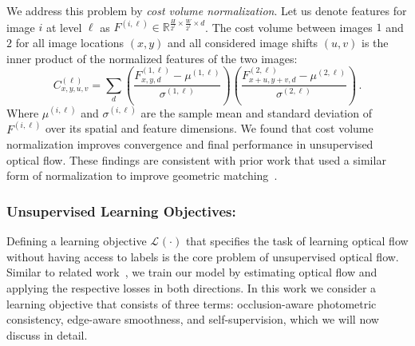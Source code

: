 \documentclass[runningheads]{llncs}
\newcommand{\lossfun}[1]{\mathcal{L}_\mathit{#1}}
\newcommand{\level}{\ell}
\begin{document}
We address this problem by \emph{cost volume normalization}. Let us denote features for image $i$ at level $\level$ as $F^{(i,\level)} \in \mathbb{R}^{\frac{H}{2^\level}\times \frac{W}{2^\level}\times d}$. The cost volume between images $1$ and $2$ for all image locations $(x, y)$ and all considered image shifts $(u, v)$ is the inner product of the normalized features of the two images:
\begin{equation}
C^{(\level)}_{x, y, u,v} = \sum_d \left(\frac{ F^{(1, \level)}_{x, y, d} - \mu^{(1, \level)}}{\sigma^{(1, \level)}} \right) \left( \frac{F^{(2,\level)}_{x+u, y+v, d}  - \mu^{(2, \level)}}{\sigma^{(2, \level)}} \right) \, .
\end{equation}
Where $\mu^{(i, \level)}$ and $\sigma^{(i, \level)}$ are the sample mean and standard deviation of $F^{(i,\level)}$ over its spatial and feature dimensions. We found that cost volume normalization improves convergence and final performance in unsupervised optical flow. These findings are consistent with prior work that used a similar form of normalization to improve geometric matching~\cite{rocco2017convolutional}.

\subsubsection{Unsupervised Learning Objectives:} Defining a learning objective $\lossfun{}(\cdot)$ that specifies the task of learning optical flow without having access to labels is the core problem of unsupervised optical flow. Similar to related work~\cite{DDFlow,SelFlow,meister2018unflow,wang2018occlusion}, we train our model by estimating optical flow and applying the respective losses in both directions. In this work we consider a learning objective that consists of three terms: occlusion-aware photometric consistency, edge-aware smoothness, and self-supervision, which we will now discuss in detail.  
\end{document}
